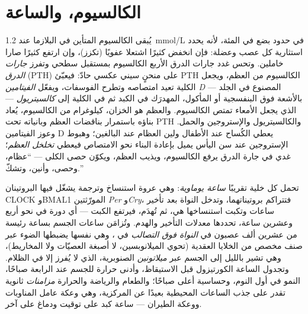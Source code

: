 \section{الكالسيوم، والساعة}

\begin{definition}\label{def:b3:endocrinology:calcium}
يُبقى الكالسيوم المتأين في البلازما عند \qty{1.2}{mmol/L} في
حدود بضع في المئة، لأنه يحدد استثارية كل عصب وعضلة: فإن
انخفض كثيرًا اشتعلا عفويًا (تكزز)، وإن ارتفع كثيرًا صارا
خاملين. وتحس غدد جارات الدرق الأربع الكالسيوم بمستقبل سطحي
وتفرز \emph{ جارات الدرق} (PTH) على منحنٍ سيني عكسي
حادّ: فيعبّئ PTH الكالسيوم من العظم، ويجعل الكلية تعيد
امتصاصه وتطرح الفوسفات، ويفعّل \emph{الفيتامين D} --- المصنوع
في الجلد بالأشعة فوق البنفسجية أو المأكول، المهدرَك في الكبد
ثم في الكلية إلى \emph{كالسيتريول} --- الذي يجعل الأمعاء
تمتص الكالسيوم. والعظم هو الخزان، كيلوغرام من الكالسيوم،
يُعاد بناؤه باستمرار بناقضات العظم وبانياته تحت PTH
والكالسيتريول والإستروجين والحمل. وعوز الفيتامين D يعطي
الكُساح عند الأطفال ولين العظام عند البالغين؛ وهبوط
الإستروجين عند سن اليأس يميل بإعادة البناء نحو الامتصاص
فيعطي \emph{تخلخل العظم}؛  غدي في جارة الدرق يرفع
الكالسيوم، ويذيب العظم، ويكوّن حصى الكلى --- ``عظام، وحصى،
وأنين، وتشكّ.''
\end{definition}

\begin{definition}\label{def:b3:endocrinology:clock}
تحمل كل خلية تقريبًا \emph{ساعة يوماوية}: وهي عروة استنساخ
وترجمة يشغّل فيها البروتينان CLOCK وBMAL1 المورّثتين
\emph{Per} و\emph{Cry}، فتتراكم بروتيناتهما، وتدخل النواة
بعد تأخير ساعات وتكبت استنساخها هي، ثم تُهدَم، فيرتفع الكبت
--- أي دورة في نحو أربع وعشرين ساعة، تحددها معدلات التأخير
والهدم. وتُزامَن ساعات الجسم بساعة رئيسة من عشرين ألف عصبون
في \emph{النواة فوق التصالب} في ، وهي نفسها يضبطها
الضوء عبر صنف مخصص من الخلايا العقدية  (تحوي
الميلانوبسين، لا أصبغة العصيّات ولا المخاريط)، وهي تشير
بالليل إلى الجسم عبر \emph{ميلاتونين} الصنوبرية، الذي لا
يُفرز إلا في الظلام. وتجدول الساعة الكورتيزول قبل الاستيقاظ،
وأدنى حرارة للجسم عند الرابعة صباحًا،  النمو في أول
النوم، وحساسية  أعلى صباحًا؛ والطعام والرياضة
والحرارة \emph{مزامنات} ثانوية تقدر على جذب الساعات المحيطية
بعيدًا عن المركزية، وهي وعكة عامل المناوبات ووعكة الطيران
--- ساعة كبد على توقيت ودماغ على آخر.
\end{definition}

